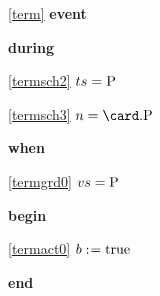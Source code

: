 \noindent \ref{term}  \textbf{event}
\begin{block}
  \item   \textbf{during}
  \begin{block}
  \item[ \eqref{termsch2} ]\sout{$ts = \text{P} $} %
  \end{block}
  \begin{block}
  \item[ \eqref{termsch3} ]{$n = \card.\Pcs$} %
  \end{block}
  \item   \textbf{when}
  \begin{block}
  \item[ \eqref{termgrd0} ]{$vs = \text{P}$} %
  \end{block}
  \item   \textbf{begin}
  \begin{block}
  \item[ \eqref{termact0} ]{$b \mathrel{:\mkern1mu=} \text{true}$} %
  \end{block}
  \item   \textbf{end} \\
\end{block}
